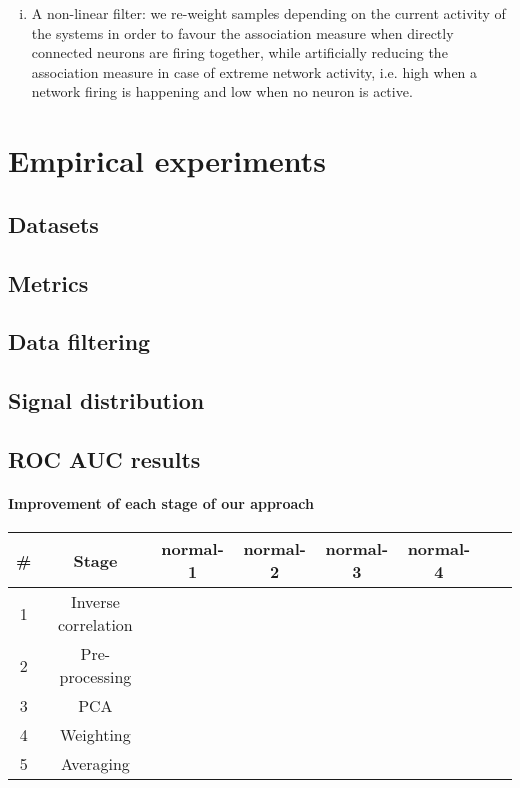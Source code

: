 \documentclass[wcp]{jmlr}
\begin{document}


\begin{enumerate}[i.]
\item A non-linear filter: we re-weight samples depending on the current
      activity of the systems in order to favour the association measure when
      directly connected neurons are firing together, while artificially
      reducing the association measure in case of extreme network activity,
      i.e. high when a network firing is happening and low when no neuron is
      active.
\end{enumerate}

\section{Empirical experiments}
\subsection{Datasets}




\subsection{Metrics}
\subsection{Data filtering}
\subsection{Signal distribution}
\subsection{ROC AUC results}
\paragraph{Improvement of each stage of our approach\\}


\begin{table}[h!]
\begin{tabular}{|c|c||c|c|c|c|c|c|} \hline
\# & Stage & normal-1 & normal-2 & normal-3 & normal-4 \\ \hline
1 & Inverse correlation & & & & \\ \hline
2 & Pre-processing & & & &\\ \hline
3 & PCA & & & &  \\ \hline
4 & Weighting & & & &  \\ \hline
5 & Averaging & & & &  \\ \hline

\end{tabular}
\end{table}
\end{document}
